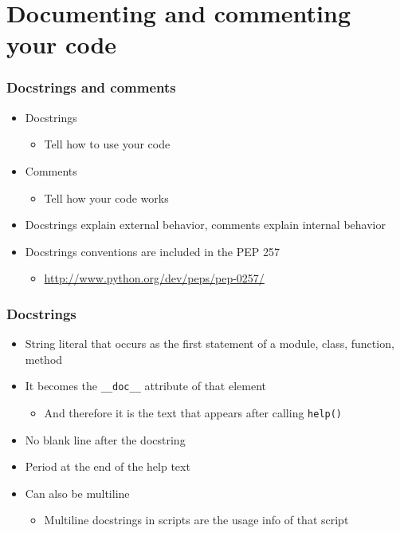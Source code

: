 \documentclass[11pt]{beamer}
\begin{document}
\section{Documenting and commenting your code}
\label{sec-3}
\begin{frame}[fragile]\frametitle{Docstrings and comments}
\label{sec-3_1}


\begin{itemize}
\item Docstrings

\begin{itemize}
\item Tell how to use your code
\end{itemize}

\item Comments

\begin{itemize}
\item Tell how your code works
\end{itemize}

\item Docstrings explain external behavior, comments explain internal
  behavior
\item Docstrings conventions are included in the PEP 257

\begin{itemize}
\item \href{http://www.python.org/dev/peps/pep-0257/}{http://www.python.org/dev/peps/pep-0257/}
\end{itemize}

\end{itemize}
\end{frame}
\begin{frame}[fragile]\frametitle{Docstrings}
\label{sec-3_2}


\begin{itemize}
\item String literal that occurs as the first statement of a module, class,
 function, method
\item It becomes the \texttt{\_\_doc\_\_} attribute of that element

\begin{itemize}
\item And therefore it is the text that appears after calling \texttt{help()}
\end{itemize}

\item No blank line after the docstring
\item Period at the end of the help text
\item Can also be multiline

\begin{itemize}
\item Multiline docstrings in scripts are the usage info of that script
\end{itemize}

\end{itemize}
\end{frame}
\end{document}
